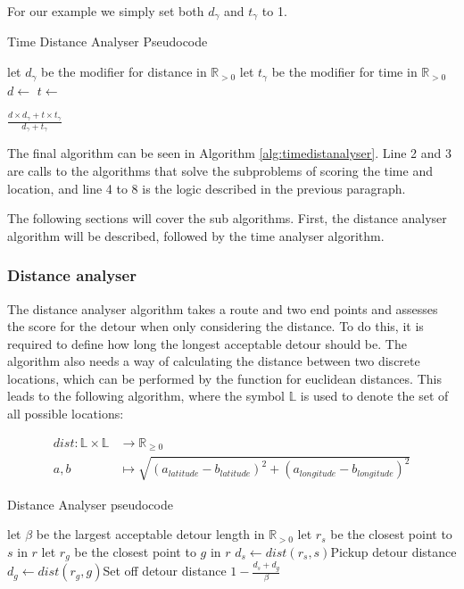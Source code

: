 For our example we simply set both $d_\gamma$ and $t_\gamma$ to 1. 

\begin{algorithm}
	\caption{Time Distance Analyser Pseudocode}
	\label{alg:timedistanalyser}
	\begin{algorithmic}[1]
		\Require 
		\Statex let $d_\gamma$ be the modifier for distance in $\mathbb{R}_{>0}$
		\Statex let $t_\gamma$ be the modifier for time in $\mathbb{R}_{>0}$
		\Statex 
			\State $d\gets$
			\State $t\gets$

				\State \Return $\frac{d\times d_\gamma+t\times t_\gamma}{d_\gamma+t_\gamma}$
			\Else
				\State{}
			\EndIf
		\EndFunction
	\end{algorithmic}
\end{algorithm}

The final algorithm can be seen in Algorithm \ref{alg:timedistanalyser}.
Line 2 and 3 are calls to the algorithms that solve the subproblems of scoring the time and location, and line 4 to 8 is the logic described in the previous paragraph.

The following sections will cover the sub algorithms.
First, the distance analyser algorithm will be described, followed by the time analyser algorithm.

\subsubsection{Distance analyser}
The distance analyser algorithm takes a route and two end points and assesses the score for the detour when only considering the distance.
To do this, it is required to define how long the longest acceptable detour should be.
The algorithm also needs a way of calculating the distance between two discrete locations, which can be performed by the function for euclidean distances.
This leads to the following algorithm, where the symbol $\mathbb{L}$ is used to denote the set of all possible locations:

\begin{align*}
	dist : \mathbb{L}\times\mathbb{L} &\rightarrow \mathbb{R}_{\geq 0}\\
	a, b &\mapsto \sqrt{(a_{latitude} - b_{latitude})^2 + (a_{longitude} - b_{longitude})^2}
\end{align*}

\begin{algorithm}
	\caption{Distance Analyser pseudocode}
	\label{alg:distanalyser}
	\begin{algorithmic}[1]
		\Require 
		\Statex let $\beta$ be the largest acceptable detour length in $\mathbb{R}_{>0}$ 
		\Statex 
			\State let $r_s$ be the closest point to $s$ in $r$
			\State let $r_g$ be the closest point to $g$ in $r$
			\State $d_s\gets dist(r_s, s)$\Comment Pickup detour distance
			\State $d_g\gets dist(r_g, g)$\Comment Set off detour distance
			\State\Return $1-\frac{d_s + d_g}{\beta}$
		\EndFunction
	\end{algorithmic}
\end{algorithm}

